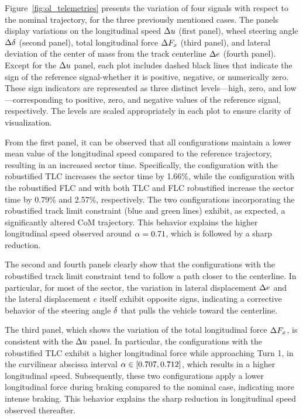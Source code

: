 Figure~\ref{fig:ol_telemetries} presents the variation of four signals with respect to the nominal trajectory, for the three previously mentioned cases. The panels display variations on the longitudinal speed $\Delta u$ (first panel), wheel steering angle $\Delta \delta$ (second panel), total longitudinal force $\Delta F_x$ (third panel), and lateral deviation of the center of mass from the track centerline $\Delta e$ (fourth panel). Except for the $\Delta u$ panel, each plot includes dashed black lines that indicate the sign of the reference signal-whether it is positive, negative, or numerically zero. These sign indicators are represented as three distinct levels---high, zero, and low---corresponding to positive, zero, and negative values of the reference signal, respectively. The levels are scaled appropriately in each plot to ensure clarity of visualization.

From the first panel, it can be observed that all configurations maintain a lower mean value of the longitudinal speed compared to the reference trajectory, resulting in an increased sector time. Specifically, the configuration with the robustified TLC increases the sector time by 1.66\%, while the configuration with the robustified FLC and with both TLC and FLC robustified increase the sector time by 0.79\% and 2.57\%, respectively.
The two configurations incorporating the robustified track limit constraint (blue and green lines) exhibit, as expected, a significantly altered CoM trajectory. This behavior explains the higher longitudinal speed observed around $\alpha = 0.71$, which is followed by a sharp reduction. 

The second and fourth panels clearly show that the configurations with the robustified track limit constraint tend to follow a path closer to the centerline. In particular, for most of the sector, the variation in lateral displacement $\Delta e$ and the lateral displacement $e$ itself exhibit opposite signs, indicating a corrective behavior of the steering angle $\delta$ that pulls the vehicle toward the centerline.

The third panel, which shows the variation of the total longitudinal force $\Delta F_x$, is consistent with the $\Delta u$ panel. In particular, the configurations with the robustified TLC exhibit a higher longitudinal force while approaching Turn 1, in the curvilinear abscissa interval $\alpha\in\left[0.707, 0.712\right]$, which results in a higher longitudinal speed. Subsequently, these two configurations apply a lower longitudinal force during braking compared to the nominal case, indicating more intense braking. This behavior explains the sharp reduction in longitudinal speed observed thereafter.

